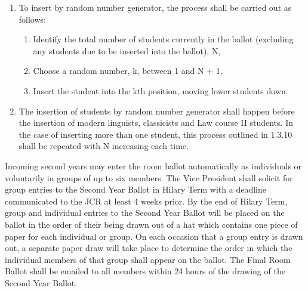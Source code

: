 \begin{enumerate}
\item To insert by random number generator, the process shall be carried out as follows:
\begin{enumerate}
\item Identify the total number of students currently in the ballot (excluding any students due to be inserted into the ballot), N,
\item Choose a random number, k, between 1 and N + 1,
\item Insert the student into the kth position, moving lower students down.
\end{enumerate}
\item The insertion of students by random number generator shall happen before the insertion of modern linguists, classicists and Law course II students. In the case of inserting more than one student, this process outlined in 1.3.10 shall be repeated with N increasing each time.
\end{enumerate}

\appnpara Incoming second years may enter the room ballot automatically as individuals or voluntarily in groups of up to six members.
\appnpara The Vice President shall solicit for group entries to the Second Year Ballot in Hilary Term with a deadline communicated to the JCR at least 4 weeks prior.
\appnpara By the end of Hilary Term, group and individual entries to the Second Year Ballot will be placed on the ballot in the order of their being drawn out of a hat which contains one piece of paper for each individual or group. On each occasion that a group entry is drawn out, a separate paper draw will take place to determine the order in which the individual members of that group shall appear on the ballot.
\appnpara The Final Room Ballot shall be emailed to all members within 24 hours of the drawing of the Second Year Ballot.

